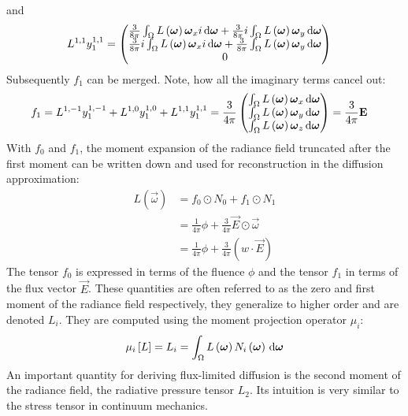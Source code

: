and
\begin{align}
L^{1,1}y^{1,1}_1 &= 
\begin{pmatrix}
\frac{3}{8\pi}\int_\Omega{L\left(\boldsymbol{\mathbf{\omega}}\right)\boldsymbol{\mathbf{\omega}}_xi\,\mathrm{d}\boldsymbol{\mathbf{\omega}}} + \frac{3}{8\pi}i\int_\Omega{L\left(\boldsymbol{\mathbf{\omega}}\right)\boldsymbol{\mathbf{\omega}}_y\,\mathrm{d}\boldsymbol{\mathbf{\omega}}}
\\
\frac{3}{8\pi}i\int_\Omega{L\left(\boldsymbol{\mathbf{\omega}}\right)\boldsymbol{\mathbf{\omega}}_xi\,\mathrm{d}\boldsymbol{\mathbf{\omega}}} + \frac{3}{8\pi}\int_\Omega{L\left(\boldsymbol{\mathbf{\omega}}\right)\boldsymbol{\mathbf{\omega}}_y\,\mathrm{d}\boldsymbol{\mathbf{\omega}}}
\\
0
\end{pmatrix}
\end{align}
Subsequently $f_1$ can be merged. Note, how all the imaginary terms cancel out:
\begin{align}
f_1 &= 
L^{1,-1}y^{1,-1}_1+L^{1,0}y^{1,0}_1+L^{1,1}y^{1,1}_1
=
\frac{3}{4\pi}
\begin{pmatrix}
\int_\Omega{L\left(\boldsymbol{\mathbf{\omega}}\right)\boldsymbol{\mathbf{\omega}}_x\,\mathrm{d}\boldsymbol{\mathbf{\omega}}}
\\
\int_\Omega{L\left(\boldsymbol{\mathbf{\omega}}\right)\boldsymbol{\mathbf{\omega}}_y\,\mathrm{d}\boldsymbol{\mathbf{\omega}}}
\\
\int_\Omega{L\left(\boldsymbol{\mathbf{\omega}}\right)\boldsymbol{\mathbf{\omega}}_z\,\mathrm{d}\boldsymbol{\mathbf{\omega}}}
\end{pmatrix}
=
\frac{3}{4\pi}\boldsymbol{\mathbf{E}}
\end{align}
With $f_0$ and $f_1$, the moment expansion of the radiance field truncated after the first moment can be written down and used for reconstruction in the diffusion approximation:
\begin{align}
\nonumber
L\left(\vec{\omega}\right) &= 
f_0\odot N_0 + f_1\odot N_1
\\
\nonumber
&=
\frac{1}{4\pi}\phi + \frac{3}{4\pi}\vec{E} \odot \vec{\omega}
\\
\label{eq:moment_expansion_L}
&=
\frac{1}{4\pi}\phi + \frac{3}{4\pi}\left(w \cdot \vec{E}\right)
\end{align}
The tensor $f_0$ is expressed in terms of the fluence $\phi$ and the tensor $f_1$ in terms of the flux vector $\vec{E}$. These quantities are often referred to as the zero and first moment of the radiance field respectively, they generalize to higher order and are denoted $L_i$. They are computed using the moment projection operator $\mu_i$:
\begin{align}
\label{eq:moment_expansion_mu}
\mu_i\left[L\right] = L_i = \int_\Omega{L\left(\boldsymbol{\mathbf{\omega}}\right)N_i\left(\boldsymbol{\mathbf{\omega}}\right)\,\mathrm{d}\boldsymbol{\mathbf{\omega}}}
\end{align}
An important quantity for deriving flux-limited diffusion is the second moment of the radiance field, the radiative pressure tensor $L_2$. Its intuition is very similar to the stress tensor in continuum mechanics.

